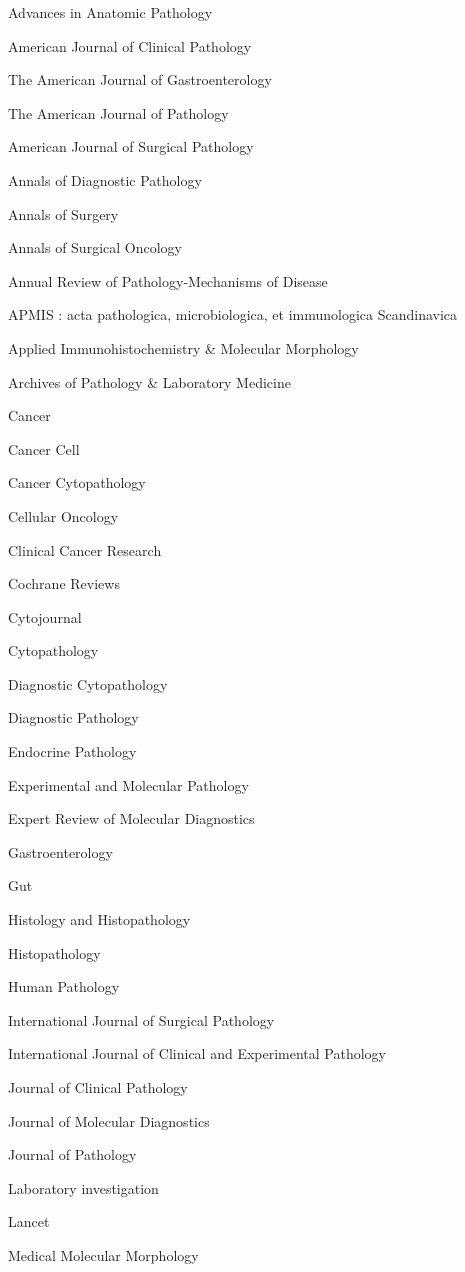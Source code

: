 \documentclass[]{article}
\begin{document}
Advances in Anatomic Pathology

American Journal of Clinical Pathology

The American Journal of Gastroenterology

The American Journal of Pathology

American Journal of Surgical Pathology

Annals of Diagnostic Pathology

Annals of Surgery

Annals of Surgical Oncology

Annual Review of Pathology-Mechanisms of Disease

APMIS : acta pathologica, microbiologica, et immunologica Scandinavica

Applied Immunohistochemistry \& Molecular Morphology

Archives of Pathology \& Laboratory Medicine

Cancer

Cancer Cell

Cancer Cytopathology

Cellular Oncology

Clinical Cancer Research

Cochrane Reviews

Cytojournal

Cytopathology

Diagnostic Cytopathology

Diagnostic Pathology

Endocrine Pathology

Experimental and Molecular Pathology

Expert Review of Molecular Diagnostics

Gastroenterology

Gut

Histology and Histopathology

Histopathology

Human Pathology

International Journal of Surgical Pathology

International Journal of Clinical and Experimental Pathology

Journal of Clinical Pathology

Journal of Molecular Diagnostics

Journal of Pathology

Laboratory investigation

Lancet

Medical Molecular Morphology
\end{document}
